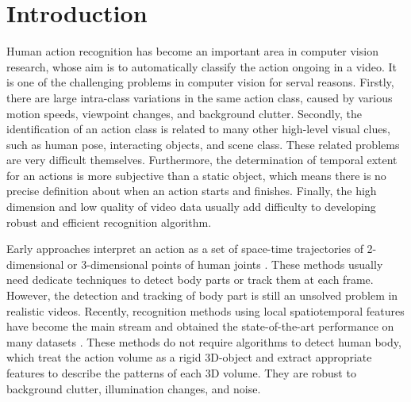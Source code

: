 \documentclass[twocolumn]{svjour3}          \smartqed  \usepackage{slashbox}
\begin{document}
\section{Introduction}
\label{intro}
Human action recognition \cite{AggarwalR11,TuragaCSU08} has become an important area in computer vision research, whose aim is to automatically classify the  action ongoing in a video. It is one of the challenging problems in computer vision for serval reasons. Firstly, there are large intra-class variations in the same action class, caused by various motion speeds, viewpoint changes, and background clutter. Secondly, the identification of an action class is related to many other high-level visual clues, such as human pose, interacting objects, and scene class. These related problems are very difficult themselves. Furthermore, the determination of temporal extent for an actions is more subjective than a static object, which means there is no precise definition about when an action starts and finishes. Finally, the high dimension and low quality of video data usually add difficulty to developing robust and efficient recognition algorithm.

Early approaches interpret an action as a set of space-time trajectories of 2-dimensional or 3-dimensional points of human joints \cite{Webb81,NiyogiA94,CampbellB95,YacoobB99}. These methods usually need dedicate techniques to detect body parts or track them at each frame. However, the detection and tracking of body part is still an unsolved problem in realistic videos. Recently, recognition methods using local spatiotemporal features \cite{Laptev05,LaptevMSR08,WangKSL13,WangQT14} have become the main stream and obtained the state-of-the-art performance on many datasets \cite{WangS13a}. These methods do not require algorithms to detect human body, which treat the action volume as a rigid 3D-object and extract appropriate features to describe the patterns of each 3D volume. They are robust to background clutter, illumination changes, and noise.
\end{document}
